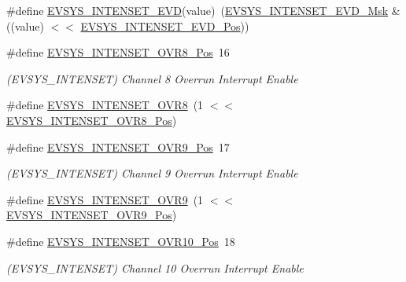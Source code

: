 \begin{DoxyCompactItemize}
\item 
\#define \mbox{\hyperlink{group___s_a_m_d21___e_v_s_y_s_ga0830117798f7624f0e050988614b0bf9}{E\+V\+S\+Y\+S\+\_\+\+I\+N\+T\+E\+N\+S\+E\+T\+\_\+\+E\+VD}}(value)~(\mbox{\hyperlink{group___s_a_m_d21___e_v_s_y_s_gae62892a13725d99783475ce3b4bfb043}{E\+V\+S\+Y\+S\+\_\+\+I\+N\+T\+E\+N\+S\+E\+T\+\_\+\+E\+V\+D\+\_\+\+Msk}} \& ((value) $<$$<$ \mbox{\hyperlink{group___s_a_m_d21___e_v_s_y_s_ga0b9e0e6564aadc19f81955941877a3a7}{E\+V\+S\+Y\+S\+\_\+\+I\+N\+T\+E\+N\+S\+E\+T\+\_\+\+E\+V\+D\+\_\+\+Pos}}))
\item 
\#define \mbox{\hyperlink{group___s_a_m_d21___e_v_s_y_s_ga3c10a5ddd0e57bb5a58184d869a4f134}{E\+V\+S\+Y\+S\+\_\+\+I\+N\+T\+E\+N\+S\+E\+T\+\_\+\+O\+V\+R8\+\_\+\+Pos}}~16
\begin{DoxyCompactList}\small\item\em (E\+V\+S\+Y\+S\+\_\+\+I\+N\+T\+E\+N\+S\+ET) Channel 8 Overrun Interrupt Enable \end{DoxyCompactList}\item 
\#define \mbox{\hyperlink{group___s_a_m_d21___e_v_s_y_s_ga0e3a5331e715ad721df09b3c230fedbd}{E\+V\+S\+Y\+S\+\_\+\+I\+N\+T\+E\+N\+S\+E\+T\+\_\+\+O\+V\+R8}}~(1 $<$$<$ \mbox{\hyperlink{group___s_a_m_d21___e_v_s_y_s_ga3c10a5ddd0e57bb5a58184d869a4f134}{E\+V\+S\+Y\+S\+\_\+\+I\+N\+T\+E\+N\+S\+E\+T\+\_\+\+O\+V\+R8\+\_\+\+Pos}})
\item 
\#define \mbox{\hyperlink{group___s_a_m_d21___e_v_s_y_s_gaec6392298233da7a5efc5880ab14131f}{E\+V\+S\+Y\+S\+\_\+\+I\+N\+T\+E\+N\+S\+E\+T\+\_\+\+O\+V\+R9\+\_\+\+Pos}}~17
\begin{DoxyCompactList}\small\item\em (E\+V\+S\+Y\+S\+\_\+\+I\+N\+T\+E\+N\+S\+ET) Channel 9 Overrun Interrupt Enable \end{DoxyCompactList}\item 
\#define \mbox{\hyperlink{group___s_a_m_d21___e_v_s_y_s_gacf728aa209af5af6563f565617abd938}{E\+V\+S\+Y\+S\+\_\+\+I\+N\+T\+E\+N\+S\+E\+T\+\_\+\+O\+V\+R9}}~(1 $<$$<$ \mbox{\hyperlink{group___s_a_m_d21___e_v_s_y_s_gaec6392298233da7a5efc5880ab14131f}{E\+V\+S\+Y\+S\+\_\+\+I\+N\+T\+E\+N\+S\+E\+T\+\_\+\+O\+V\+R9\+\_\+\+Pos}})
\item 
\#define \mbox{\hyperlink{group___s_a_m_d21___e_v_s_y_s_ga3c09fd231a51336268fa4a1418365af7}{E\+V\+S\+Y\+S\+\_\+\+I\+N\+T\+E\+N\+S\+E\+T\+\_\+\+O\+V\+R10\+\_\+\+Pos}}~18
\begin{DoxyCompactList}\small\item\em (E\+V\+S\+Y\+S\+\_\+\+I\+N\+T\+E\+N\+S\+ET) Channel 10 Overrun Interrupt Enable \end{DoxyCompactList}\item 
$$
\end{DoxyCompactItemize}
